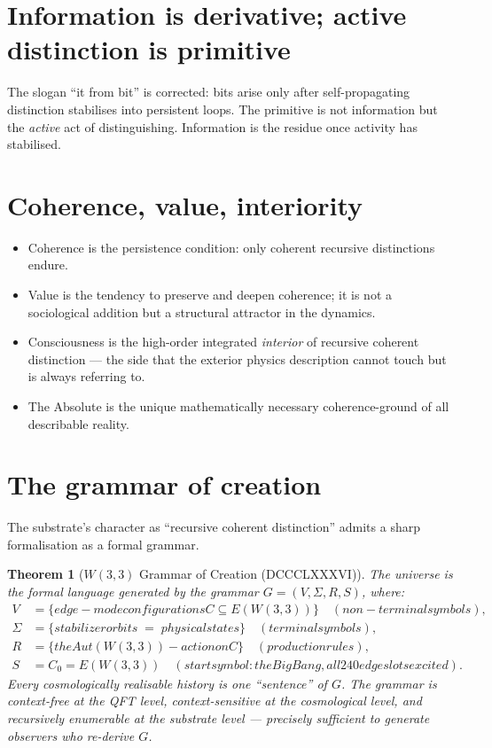 \documentclass[11pt]{article}
\def\mathrm#1{#1}%
\def\mathcal#1{#1}%
\def\textbf#1{#1}%
\def\text#1{#1}%
\newtheorem*{theorem}{Theorem}
\begin{document}
\section{Information is derivative; active distinction is primitive}

The slogan ``it from bit'' is corrected: bits arise only after self-propagating distinction stabilises into persistent loops. The primitive is not information but the \emph{active} act of distinguishing. Information is the residue once activity has stabilised.

\section{Coherence, value, interiority}

\begin{itemize}[leftmargin=2em]
\item \textbf{Coherence} is the persistence condition: only coherent recursive distinctions endure.
\item \textbf{Value} is the tendency to preserve and deepen coherence; it is not a sociological addition but a structural attractor in the dynamics.
\item \textbf{Consciousness} is the high-order integrated \emph{interior} of recursive coherent distinction --- the side that the exterior physics description cannot touch but is always referring to.
\item \textbf{The Absolute} is the unique mathematically necessary coherence-ground of all describable reality.
\end{itemize}

\section{The grammar of creation}

\label{sec:grammar-of-creation}

The substrate's character as ``recursive coherent distinction'' admits a sharp formalisation as a formal grammar.

\begin{theorem}[$W(3,3)$ Grammar of Creation (DCCCLXXXVI)]
The universe is the formal language generated by the grammar $G = (V, \Sigma, R, S)$, where:
\begin{align*}
V &= \{\text{edge-mode configurations } \mathcal{C} \subseteq E(W(3,3))\} \quad (\text{non-terminal symbols}), \\
\Sigma &= \{\text{stabilizer orbits} \;=\; \text{physical states}\} \quad (\text{terminal symbols}), \\
R &= \{\text{the } \mathrm{Aut}(W(3,3))\text{-action on } \mathcal{C}\} \quad (\text{production rules}), \\
S &= \mathcal{C}_0 = E(W(3,3)) \quad (\text{start symbol: the Big Bang, all 240 edge slots excited}).
\end{align*}
Every cosmologically realisable history is one ``sentence'' of $G$. The grammar is context-free at the QFT level, context-sensitive at the cosmological level, and recursively enumerable at the substrate level --- precisely sufficient to generate observers who re-derive $G$.
\end{theorem}
\end{document}
